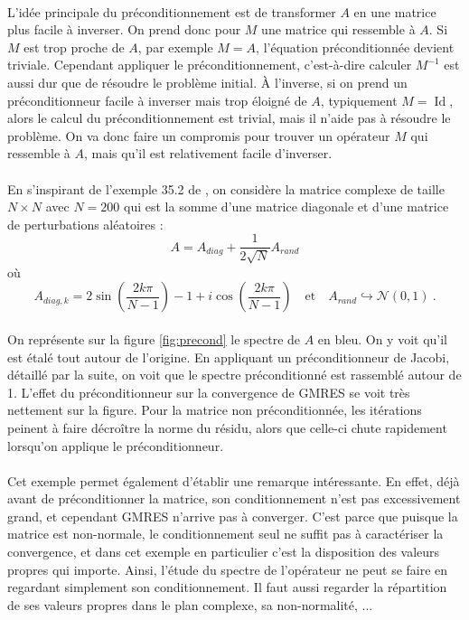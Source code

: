 		\paragraph{}
		L'idée principale du préconditionnement est de transformer $A$ en une matrice plus facile à inverser.
		On prend donc pour $M$ une matrice qui ressemble à $A$.
		Si $M$ est trop proche de $A$, par exemple $M=A$, l'équation préconditionnée devient triviale.
		Cependant appliquer le préconditionnement, c'est-à-dire calculer $M^{-1}$ est aussi dur que de résoudre le problème initial.
		À l'inverse, si on prend un préconditionneur facile à inverser mais trop éloigné de $A$, typiquement $M = \operatorname{Id}$, alors le calcul du préconditionnement est trivial, mais il n'aide pas à résoudre le problème.
		On va donc faire un compromis pour trouver un opérateur $M$ qui ressemble à $A$, mais qu'il est relativement facile d'inverser.

		\paragraph{}
		En s'inspirant de l'exemple 35.2 de \cite{TrefethenBau1997}, on considère la matrice complexe de taille $N\times N$ avec $N = 200$ qui est la somme d'une matrice diagonale et d'une matrice de perturbations aléatoires :
		\[A = A_{diag} + \frac{1}{2\sqrt{N}}A_{rand}\]
		où
		\[A_{diag, k} = 2\sin\left(\frac{2k\pi}{N-1}\right) - 1 + i\cos\left(\frac{2k\pi}{N-1}\right) \quad\textrm{et}\quad A_{rand}\hookrightarrow\mathcal{N}\left(0,1\right)\ .\]

		\paragraph{}
		On représente sur la figure \ref{fig:precond} le spectre de $A$ en bleu.
		On y voit qu'il est étalé tout autour de l'origine.
		En appliquant un préconditionneur de Jacobi, détaillé par la suite, on voit que le spectre préconditionné est rassemblé autour de 1.
		L'effet du préconditionneur sur la convergence de GMRES se voit très nettement sur la figure.
		Pour la matrice non préconditionnée, les itérations peinent à faire décroître la norme du résidu, alors que celle-ci chute rapidement lorsqu'on applique le préconditionneur.

		\paragraph{}
		Cet exemple permet également d'établir une remarque intéressante.
		En effet, déjà avant de préconditionner la matrice, son conditionnement n'est pas excessivement grand, et cependant GMRES n'arrive pas à converger.
		C'est parce que puisque la matrice est non-normale, le conditionnement seul ne suffit pas à caractériser la convergence, et dans cet exemple en particulier c'est la disposition des valeurs propres qui importe.
		Ainsi, l'étude du spectre de l'opérateur ne peut se faire en regardant simplement son conditionnement.
		Il faut aussi regarder la répartition de ses valeurs propres dans le plan complexe, sa non-normalité, ...


